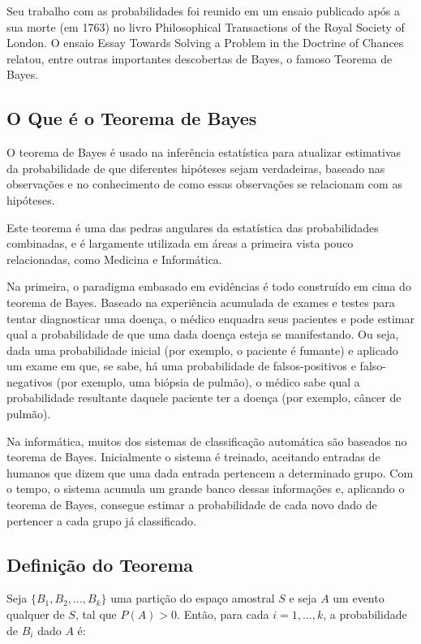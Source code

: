 Seu trabalho com as probabilidades foi reunido em um ensaio
publicado após a sua morte (em 1763) no livro Philosophical
Transactions of the Royal Society of London. O ensaio Essay
Towards Solving a Problem in the Doctrine of Chances relatou,
entre outras importantes descobertas de Bayes, o famoso Teorema de
Bayes.


\subsection{ O Que é o Teorema de Bayes}

O teorema de Bayes é usado na inferência estatística para
atualizar estimativas da probabilidade de que diferentes hipóteses
sejam verdadeiras, baseado nas observações e no conhecimento de
como essas observações se relacionam com as hipóteses.\vskip0.3cm

Este teorema é uma das pedras angulares da estatística das
probabilidades combinadas, e é largamente utilizada em áreas a
primeira vista pouco relacionadas, como Medicina e
Informática. \vskip0.3cm

Na primeira, o paradigma embasado em evidências é todo construído
em cima do teorema de Bayes. Baseado na experiência acumulada de
exames e testes para tentar diagnosticar uma doença, o médico
enquadra seus pacientes e pode estimar qual a probabilidade de que
uma dada doença esteja se manifestando. Ou seja, dada uma
probabilidade inicial (por exemplo, o paciente é fumante) e
aplicado um exame em que, se sabe, há uma probabilidade de
falsos-positivos e falso-negativos (por exemplo, uma biópsia de
pulmão), o médico sabe qual a probabilidade resultante daquele
paciente ter a doença (por exemplo, câncer de pulmão).\vskip0.3cm

Na informática, muitos dos sistemas de classificação automática
são baseados no teorema de Bayes. Inicialmente o sistema é
treinado, aceitando entradas de humanos que dizem que uma dada
entrada pertencem a determinado grupo. Com o tempo, o sistema
acumula um grande banco dessas informações e, aplicando o teorema
de Bayes, consegue estimar a probabilidade de cada novo dado de
pertencer a cada grupo já classificado.\vskip0.3cm

\subsection{Definição do Teorema}

Seja $\{B_1, B_2, \dots, B_k\}$ uma partição do espaço amostral $S$ e seja $A$ um evento qualquer de $S$, tal que $P(A) > 0$. Então, para cada $i = 1, \dots, k$, a probabilidade de $B_i$ dado $A$ é:


